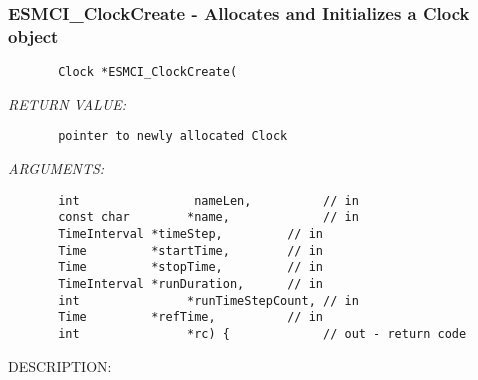  
\setlength{\oldparskip}{\parskip}
\setlength{\parskip}{1.5ex}
\setlength{\oldparindent}{\parindent}
\setlength{\parindent}{0pt}
\setlength{\oldbaselineskip}{\baselineskip}
\setlength{\baselineskip}{11pt}
 
\def\bv{\begin{verbatim}}
\def\ev{\end{verbatim}}
\def\be{\begin{equation}}
\def\ee{\end{equation}}
\def\bea{\begin{eqnarray}}
\def\eea{\end{eqnarray}}
\def\bi{\begin{itemize}}
\def\ei{\end{itemize}}
\def\bn{\begin{enumerate}}
\def\en{\end{enumerate}}
\def\bd{\begin{description}}
\def\ed{\end{description}}
\def\({\left (}
\def\){\right )}
\def\[{\left [}
\def\]{\right ]}
\def\<{\left  \langle}
\def\>{\right \rangle}
\def\cI{{\cal I}}
\def\diag{\mathop{\rm diag}}
\def\tr{\mathop{\rm tr}}


 
\subsubsection [ESMCI\_ClockCreate] {ESMCI\_ClockCreate - Allocates and Initializes a Clock object}


  
\begin{verbatim}       Clock *ESMCI_ClockCreate(\end{verbatim}{\em RETURN VALUE:}
\begin{verbatim}       pointer to newly allocated Clock\end{verbatim}{\em ARGUMENTS:}
\begin{verbatim}       int                nameLen,          // in
       const char        *name,             // in
       TimeInterval *timeStep,         // in
       Time         *startTime,        // in
       Time         *stopTime,         // in
       TimeInterval *runDuration,      // in
       int               *runTimeStepCount, // in
       Time         *refTime,          // in
       int               *rc) {             // out - return code
 \end{verbatim}
{\sf DESCRIPTION:\\ }


